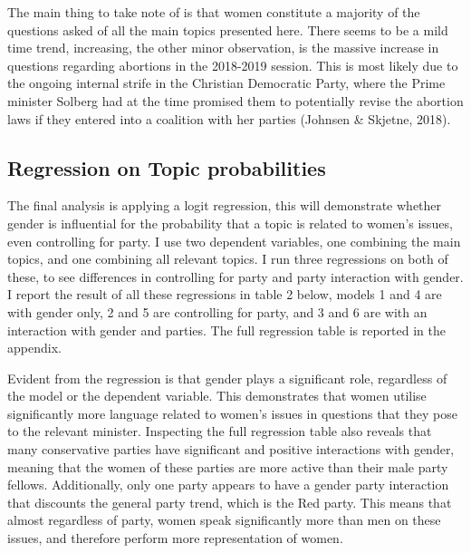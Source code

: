 \documentclass[12pt]{article}
\begin{document}
	
	The main thing to take note of is that women constitute a majority of the questions asked of all the main topics presented here. There seems to be a mild time trend, increasing, the other minor observation, is the massive increase in questions regarding abortions in the 2018-2019 session. This is most likely due to the ongoing internal strife in the Christian Democratic Party, where the Prime minister Solberg had at the time promised them to potentially revise the abortion laws if they entered into a coalition with her parties (Johnsen \& Skjetne, 2018). 
	
	\subsection{Regression on Topic probabilities}
	
	The final analysis is applying a logit regression, this will demonstrate whether gender is influential for the probability that a topic is related to women's issues, even controlling for party. I use two dependent variables, one combining the main topics, and one combining all relevant topics. I run three regressions on both of these, to see differences in controlling for party and party interaction with gender. I report the result of all these regressions in table 2 below, models 1 and 4 are with gender only, 2 and 5 are controlling for party, and 3 and 6 are with an interaction with gender and parties. The full regression table is reported in the appendix. 
	
	Evident from the regression is that gender plays a significant role, regardless of the model or the dependent variable. This demonstrates that women utilise significantly more language related to women's issues in questions that they pose to the relevant minister. Inspecting the full regression table also reveals that many conservative parties have significant and positive interactions with gender, meaning that the women of these parties are more active than their male party fellows. Additionally, only one party appears to have a gender party interaction that discounts the general party trend, which is the Red party. This means that almost regardless of party, women speak significantly more than men on these issues, and therefore perform more representation of women. 
	
\end{document}
